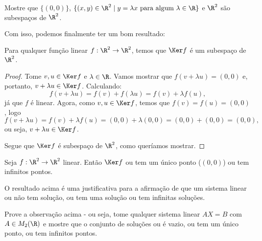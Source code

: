 \begin{exerc}
	Mostre que $\{(0,0)\}$, $\{(x,y)\in \R^2\mid y=\lambda x \mbox{ para algum }\lambda\in \R\}$ e $\R^2$ são subespaços de $\R^2$.
\end{exerc}

Com isso, podemos finalmente ter um bom resultado:

\begin{prop}
	Para qualquer função linear $f:\R^2\to\R^2$, temos que $\Ker f$ é um subespaço de $\R^2$.
\end{prop}

\begin{proof}
	Tome $v,u\in \Ker f$ e $\lambda\in \R$. Vamos mostrar que $f(v+\lambda u)=(0,0)$ e, portanto, $v+\lambda u\in \Ker f$. Calculando:
	\[f(v+\lambda u)=f(v)+f(\lambda u)=f(v)+\lambda f(u),\]já que $f$ é linear. Agora, como $v,u\in \Ker f$, temos que $f(v)=f(u)=(0,0)$, logo
	\[f(v+\lambda u)=f(v)+\lambda f(u)=(0,0)+\lambda (0,0)=(0,0)+(0,0)=(0,0),\]ou seja, $v+\lambda u\in \Ker f$. 
	
	Segue que $\Ker f$ é subespaço de $\R^2$, como queríamos mostrar.
\end{proof}
\begin{cor}
	Seja $f:\R^2\to\R^2$ linear. Então $\Ker f$ ou tem um único ponto ($(0,0)$) ou tem infinitos pontos. 
\end{cor}

\begin{rmk}
	O resultado acima é uma justificativa para a afirmação de que um sistema linear ou não tem solução, ou tem uma solução ou tem infinitas soluções.
\end{rmk}

\begin{exerc}
	Prove a observação acima - ou seja, tome qualquer sistema linear $AX=B$ com $A\in M_2(\R)$ e mostre que o conjunto de soluções ou é vazio, ou tem um único ponto, ou tem infinitos pontos.
\end{exerc}
